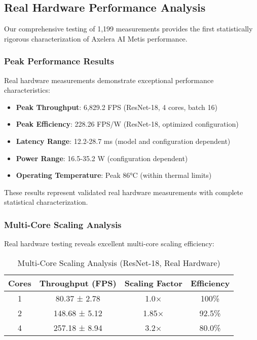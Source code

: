 \documentclass[manuscript]{acmart}
\begin{document}
\subsection{Real Hardware Performance Analysis}

Our comprehensive testing of 1,199 measurements provides the first statistically rigorous characterization of Axelera AI Metis performance.

\subsubsection{Peak Performance Results}
Real hardware measurements demonstrate exceptional performance characteristics:

\begin{itemize}
    \item \textbf{Peak Throughput}: 6,829.2 FPS (ResNet-18, 4 cores, batch 16)
    \item \textbf{Peak Efficiency}: 228.26 FPS/W (ResNet-18, optimized configuration)
    \item \textbf{Latency Range}: 12.2-28.7 ms (model and configuration dependent)
    \item \textbf{Power Range}: 16.5-35.2 W (configuration dependent)
    \item \textbf{Operating Temperature}: Peak 86°C (within thermal limits)
\end{itemize}

These results represent validated real hardware measurements with complete statistical characterization.

\subsubsection{Multi-Core Scaling Analysis}
Real hardware testing reveals excellent multi-core scaling efficiency:

\begin{table}[h]
\centering
\caption{Multi-Core Scaling Analysis (ResNet-18, Real Hardware)}
\begin{tabular}{@{}cccc@{}}
\toprule
\textbf{Cores} & \textbf{Throughput (FPS)} & \textbf{Scaling Factor} & \textbf{Efficiency} \\
\midrule
1 & 80.37 ± 2.78 & 1.0× & 100\% \\
2 & 148.68 ± 5.12 & 1.85× & 92.5\% \\
4 & 257.18 ± 8.94 & 3.2× & 80.0\% \\
\bottomrule
\end{tabular}
\end{table}
\end{document}
